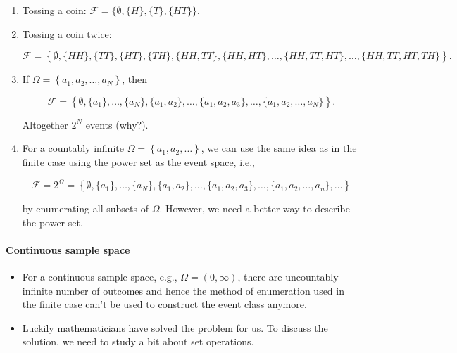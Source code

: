 \begin{enumerate}[resume]
\item Tossing a coin: $\mathcal{F} =\{\emptyset,\{H\},\{T\},\{H T\}\}$.
\item Tossing a coin twice:

\begin{equation*}
\mathcal{F} = \left\{\emptyset,\{H H\},\{T T\},\{H T\},\{T H\},
 \{H H, T T\},\{H H, H T\}, \ldots, 
\{H H, T T, H T\}, \ldots,\{H H, T T, H T, T H\} \right\}.
\end{equation*}


\item If $\Omega=\left\{a_{1}, a_{2}, \ldots, a_{N}\right\}$, then

\begin{equation*}
\mathcal{F}=\left\{\emptyset,\{a_{1}\},
\ldots,\{a_{N}\}, \{a_{1}, a_{2}\},
\ldots,\{a_{1}, a_{2}, a_{3}\}, \ldots,
\{a_{1}, a_{2}, \ldots, a_{N}\}\right\}.
\end{equation*}

Altogether $2^{N}$ events (why?).


\item For a countably infinite $\Omega = \left\{a_{1}, a_{2},
\ldots \right\}$, we can use the same idea as in the finite case using the power set as the event space, i.e.,

\begin{equation*}
\mathcal{F} = 2^{\Omega} = \left\{\emptyset,\{a_{1}\},
\ldots,\{a_{N}\}, \{a_{1}, a_{2}\},
\ldots,\{a_{1}, a_{2}, a_{3}\}, \ldots,
\{a_{1}, a_{2}, \ldots, a_{n}\}, \ldots \right\}
\end{equation*}

by enumerating all subsets of $\Omega$. However, we need a better way to describe the power set.
\end{enumerate}

\paragraph{Continuous sample space}

\begin{itemize}
\item For a continuous sample space, e.g., $\Omega = (0,\infty)$, there are uncountably infinite number of outcomes and hence the method of enumeration used in the finite case can't be used to construct the event class anymore.
\item Luckily mathematicians have solved the problem for us. To discuss the solution, we need to study a bit about set operations.
\end{itemize}

